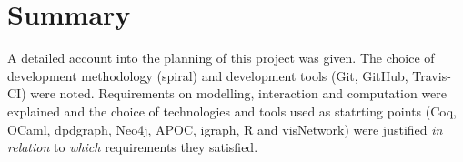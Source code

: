 \section{Summary}

A detailed account into the planning of this project was given. The choice of
development methodology (spiral) and development tools (Git, GitHub, Travis-CI)
were noted. Requirements on modelling, interaction and computation were
explained and the choice of technologies and tools used as statrting points
(Coq, OCaml, dpdgraph, Neo4j, APOC, igraph, R and visNetwork) were justified
\emph{in relation} to \emph{which} requirements they satisfied.
